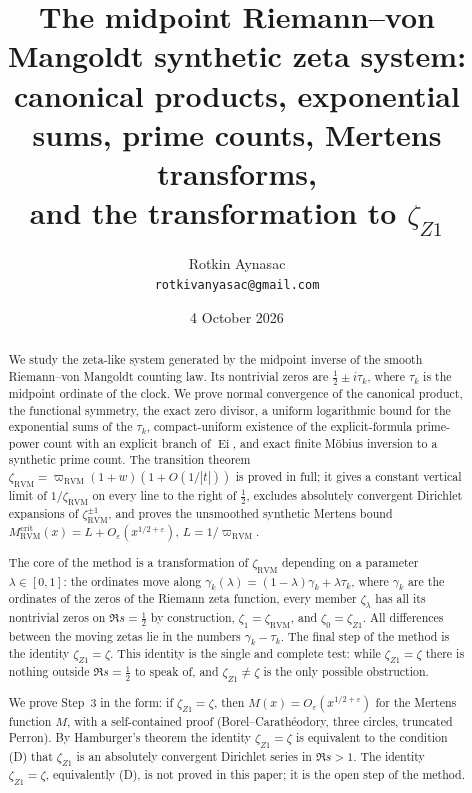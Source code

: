 \documentclass[11pt,reqno]{amsart}
\numberwithin{equation}{section}
\theoremstyle{plain}
\theoremstyle{definition}
\theoremstyle{remark}
\newcommand{\eps}{\varepsilon}
\newcommand{\Ei}{\operatorname{Ei}}
\newcommand{\RVM}{\mathrm{RVM}}
\newcommand{\crit}{\mathrm{crit}}
\providecommand{\NoCaseChange}[1]{\lowercase{#1}}
\begin{document}
\title[The midpoint RVM synthetic zeta system]{The midpoint Riemann--von Mangoldt synthetic zeta system:\\
canonical products, exponential sums, prime counts, Mertens transforms,\\
and the transformation to $\zeta_{Z1}$}
\author{Rotkin Aynasac\\[2pt]\NoCaseChange{\normalfont\texttt{rotkivanyasac@gmail.com}}}
\date{4 October 2026}

\begin{abstract}
We study the zeta-like system generated by the midpoint inverse of the smooth Riemann--von Mangoldt counting law.  Its nontrivial zeros are $\tfrac12\pm i\tau_k$, where $\tau_k$ is the midpoint ordinate of the clock.  We prove normal convergence of the canonical product, the functional symmetry, the exact zero divisor, a uniform logarithmic bound for the exponential sums of the $\tau_k$, compact-uniform existence of the explicit-formula prime-power count with an explicit branch of $\Ei$, and exact finite M\"obius inversion to a synthetic prime count.  The transition theorem $\zeta_{\RVM}=\varpi_{\RVM}(1+w)(1+O(1/|t|))$ is proved in full; it gives a constant vertical limit of $1/\zeta_{\RVM}$ on every line to the right of $\tfrac12$, excludes absolutely convergent Dirichlet expansions of $\zeta_{\RVM}^{\pm1}$, and proves the unsmoothed synthetic Mertens bound $M_{\RVM}^{\crit}(x)=L+O_\eps(x^{1/2+\eps})$, $L=1/\varpi_{\RVM}$.

The core of the method is a transformation of $\zeta_{\RVM}$ depending on a parameter $\lambda\in[0,1]$: the ordinates move along $\gamma_k(\lambda)=(1-\lambda)\gamma_k+\lambda\tau_k$, where $\gamma_k$ are the ordinates of the zeros of the Riemann zeta function, every member $\zeta_\lambda$ has all its nontrivial zeros on $\Re s=\tfrac12$ by construction, $\zeta_1=\zeta_{\RVM}$, and $\zeta_0=\zeta_{Z1}$.  All differences between the moving zetas lie in the numbers $\gamma_k-\tau_k$.  The final step of the method is the identity $\zeta_{Z1}=\zeta$.  This identity is the single and complete test: while $\zeta_{Z1}=\zeta$ there is nothing outside $\Re s=\tfrac12$ to speak of, and $\zeta_{Z1}\neq\zeta$ is the only possible obstruction.

We prove Step~3 in the form: if $\zeta_{Z1}=\zeta$, then $M(x)=O_\eps(x^{1/2+\eps})$ for the Mertens function $M$, with a self-contained proof (Borel--Carath\'eodory, three circles, truncated Perron).  By Hamburger's theorem the identity $\zeta_{Z1}=\zeta$ is equivalent to the condition (D) that $\zeta_{Z1}$ is an absolutely convergent Dirichlet series in $\Re s>1$.  The identity $\zeta_{Z1}=\zeta$, equivalently (D), is not proved in this paper; it is the open step of the method.
\end{abstract}
\end{document}
